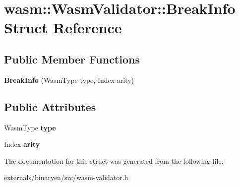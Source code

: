 \hypertarget{structwasm_1_1_wasm_validator_1_1_break_info}{}\section{wasm\+:\+:Wasm\+Validator\+:\+:Break\+Info Struct Reference}
\label{structwasm_1_1_wasm_validator_1_1_break_info}
\subsection*{Public Member Functions}
\begin{DoxyCompactItemize}
\item 
\mbox{\label{structwasm_1_1_wasm_validator_1_1_break_info_a84c0ae4fea844e2e9beb391dacda92aa}} 
{\bfseries Break\+Info} (Wasm\+Type type, Index arity)
\end{DoxyCompactItemize}
\subsection*{Public Attributes}
\begin{DoxyCompactItemize}
\item 
\mbox{\label{structwasm_1_1_wasm_validator_1_1_break_info_acf2c4481ae4241a43c0f7ce5fc8eaa6e}} 
Wasm\+Type {\bfseries type}
\item 
\mbox{\label{structwasm_1_1_wasm_validator_1_1_break_info_a14d5a82a400041b3b3d4e65918a45112}} 
Index {\bfseries arity}
\end{DoxyCompactItemize}


The documentation for this struct was generated from the following file\+:\begin{DoxyCompactItemize}
\item 
externals/binaryen/src/wasm-\/validator.\+h\end{DoxyCompactItemize}
